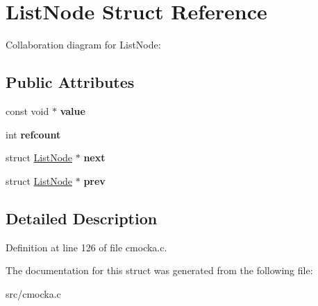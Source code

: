 \hypertarget{structListNode}{}\section{List\+Node Struct Reference}
\label{structListNode}


Collaboration diagram for List\+Node\+:
\subsection*{Public Attributes}
\begin{DoxyCompactItemize}
\item 
\mbox{\label{structListNode_a048e935049ce14b34caab57c975a9ace}} 
const void $\ast$ {\bfseries value}
\item 
\mbox{\label{structListNode_a4b3cd4e8c0dab91f5a07978b50d63b38}} 
int {\bfseries refcount}
\item 
\mbox{\label{structListNode_ac7af9e18e0586f13d59a52b3501ac4ca}} 
struct \hyperlink{structListNode}{List\+Node} $\ast$ {\bfseries next}
\item 
\mbox{\label{structListNode_ac29aefb7627ded4e29dcb96b7a47f3f2}} 
struct \hyperlink{structListNode}{List\+Node} $\ast$ {\bfseries prev}
\end{DoxyCompactItemize}


\subsection{Detailed Description}


Definition at line 126 of file cmocka.\+c.



The documentation for this struct was generated from the following file\+:\begin{DoxyCompactItemize}
\item 
src/cmocka.\+c\end{DoxyCompactItemize}
